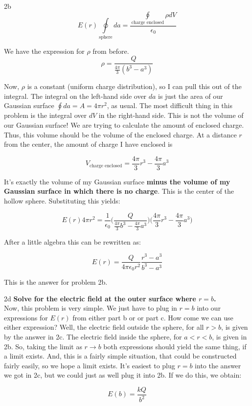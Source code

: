 \begin{homeworkProblem}[Quiz 3, Pr. 2]
\begin{homeworkSection}{2b}
        \[
            E(r)\oint\limits_{\text{sphere}} da =
            \frac{\oint\limits_{\text{charge enclosed}}\rho dV}{\epsilon_0}
        \]

        We have the expression for $\rho$ from before.
        \[ \rho = \frac{Q}{\frac{4\pi}{3}(b^3- a^3)} \]

        Now, $\rho$ is a constant (uniform charge distribution), so I
        can pull this out of the integral. The integral on the left-hand
        side over $da$ is just the area of our Gaussian surface $\oint
        da = A = 4\pi r^2$, as usual. The most difficult thing in this
        problem is the integral over $dV$ in the right-hand side. This
        is not the volume of our Gaussian surface! We are trying to
        calculate the amount of enclosed charge. Thus, this volume
        should be the volume of the enclosed charge. At a distance $r$
        from the center, the amount of charge I have enclosed is

        \[
        V_{\text{charge enclosed}} = \frac{4\pi}{3}r^3 -
        \frac{4\pi}{3}a^3
        \]

        It's exactly the volume of my Gaussian surface \textbf{minus the
        volume of my Gaussian surface in which there is no charge}. This
        is the center of the hollow sphere. Substituting this yields:

        \[
        E(r)4\pi r^2  = \frac{1}{\epsilon_0} \bigg(
        \frac{Q}{\frac{4\pi}{3}b^3 - \frac{4\pi}{3}a^3}\bigg) \bigg( \frac{4\pi}{3}
        r^3 -\frac{4\pi}{3}a^3 \bigg)
        \]

        After a little algebra this can be rewritten as:

        \[
        E(r) = \frac{Q}{4\pi \epsilon_0 r^2} \frac{r^3-a^3}{b^3-a^3}
        \]

        This is the answer for problem 2b.
    \end{homeworkSection}
    \begin{homeworkSection}{2d}
        \textbf{Solve for the electric field at the outer surface where
        $r=b$.}
        \\

        Now, this problem is very simple. We just have to plug in $r=b$
        into our expressions for $E(r)$ from either part b or or part c.
        How come we can use either expression? Well, the electric field
        outside the sphere, for all $r>b$, is given by the answer in 2c.
        The electric field inside the sphere, for $a<r<b$, is given in
        2b. So, taking the limit as $r\rightarrow b$ both expressions
        should yield the same thing, if a limit exists. And, this is a
        fairly simple situation, that could be constructed fairly
        easily, so we hope a limit exists. It's easiest to plug $r=b$
        into the answer we got in 2c, but we could just as well plug it
        into 2b. If we do this, we obtain:

        \[
        E(b) = \frac{kQ}{b^2}
        \]
    \end{homeworkSection}
\end{homeworkProblem}
